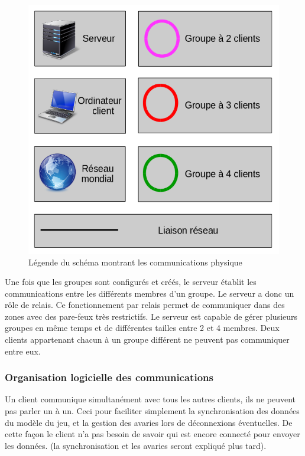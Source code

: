 \documentclass[a4paper, titlepage]{livret}
\begin{document}
   \begin{figure}[th]
      \begin{center}
        \includegraphics[scale=0.2]{Assets/l_r_1.png}
        \caption{Légende du schéma montrant les communications physique}
        \label{leSchémaCom}
      \end{center}
    \end{figure}
    
  
  Une fois que les groupes sont configurés et créés, le serveur établit les communications entre les différents membres d’un groupe. Le serveur a donc un rôle de relais.
Ce fonctionnement par relais permet de communiquer dans des zones avec des pare-feux très restrictifs.
Le serveur est capable de gérer plusieurs groupes en même temps et de différentes tailles entre 2 et 4 membres. Deux clients appartenant chacun à un groupe différent ne peuvent pas communiquer entre eux.

\subsubsection{Organisation logicielle des communications}

  Un client communique simultanément avec tous les autres clients, ils ne peuvent pas parler un à un. 
Ceci pour faciliter simplement la synchronisation des données du modèle du jeu, et la gestion des avaries lors de déconnexions éventuelles. De cette façon le client n’a pas besoin de savoir qui est encore connecté pour envoyer les données. (la synchronisation et les avaries seront expliqué plus tard).
  
\end{document}
